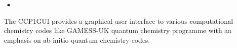 \begin{itemize}
\item 
\end{itemize}The CCP1GUI provides a graphical user interface to various computational chemistry codes like GAMESS-UK quantum chemistry programme with an emphasis on ab initio quantum chemistry codes.